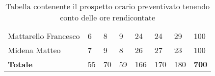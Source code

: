\begin{table}
\begin{tabular}{l|llllll|l}
\rowcolor[HTML]{DEDEDE}
Mattarello Francesco                & 6                         & 8                         & 9                        & 24                        & 24                        & 29                        & 100                        \\
\rowcolor[HTML]{E8E8E8} 
Midena Matteo                       & 7                         & 9                         & 8                        & 26                        & 27                        & 23                        & 100                        \\ \hline
\rowcolor[HTML]{C0C0C0} 
\textbf{Totale}                     & 55                        & 70                        & 59                       & 166                       & 170                       & 180                       & \textbf{700}              
\end{tabular}
\caption{Tabella contenente il prospetto orario preventivato tenendo conto delle ore rendicontate}
\end{table}

